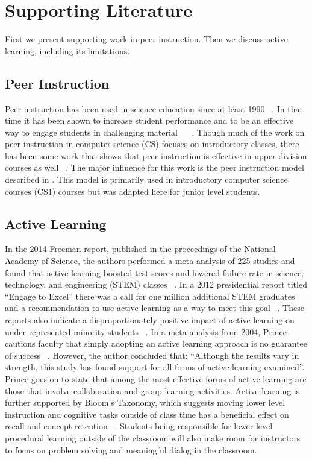 \documentclass[12pt]{article}
\begin{document}
\section{Supporting Literature}
First we present supporting work in peer instruction.  Then we discuss active learning, including its limitations. 

\subsection{Peer Instruction}
Peer instruction has been used in science education since at least 1990 ~\cite{crouchPeerInstructionTen2001}. In that time it has been shown to increase student performance and to be an effective way to engage students in challenging material ~\cite{simonExperienceReportPeer2010a} ~\cite{porterMultiinstitutionalStudyPeer2016}. Though much of the work on peer instruction in computer science (CS) focuses on introductory classes, there has been some work that shows that peer instruction is effective in upper division courses as well ~\cite{leeCanPeerInstruction2013}.
The major influence for this work is the peer instruction model described in \cite{porterPeerInstructionStudents2011}. This model is primarily used in introductory computer science courses (CS1) courses but was adapted here for junior level students. 

\subsection{Active Learning}
In the 2014 Freeman report, published in the proceedings of the National Academy of Science, the authors performed a meta-analysis of 225 studies and found that active learning boosted test scores and lowered failure rate in science, technology, and engineering (STEM) classes ~\cite{freemanActiveLearningIncreases2014}. In a 2012 presidential report titled ``Engage to Excel'' there was a call for one million additional STEM graduates and a recommendation to use active learning as a way to meet this goal ~\cite{gatesEngageExcel2012}. These reports also indicate a disproportionately positive impact of active learning on under represented minority students ~\cite{freemanActiveLearningIncreases2014}.
In a meta-analysis from 2004, Prince cautions faculty that simply adopting an active learning approach is no guarantee of success ~\cite{princeDoesActiveLearning2004}. However, the author concluded that: ``Although the results vary in strength, this study has found support for all forms of active learning examined''. Prince goes on to state that among the most effective forms of active learning are those that involve collaboration and group learning activities.
Active learning is further supported by Bloom’s Taxonomy, which suggests moving lower level instruction and cognitive tasks outside of class time has a beneficial effect on recall and concept retention ~\cite{andersonTaxonomyLearningTeaching2014}. Students being responsible for lower level procedural learning outside of the classroom will also make room for instructors to focus on problem solving and meaningful dialog in the classroom.
\end{document}
